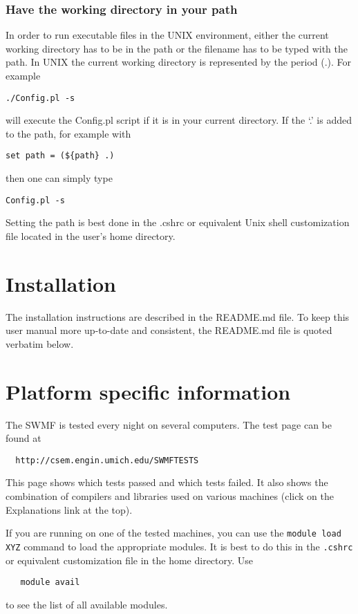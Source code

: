 \subsubsection{Have the working directory in your path}

In order to run executable files in the UNIX environment, either
the current working directory has to be in the path or the filename has
to be typed with the path.
In UNIX the current working directory is represented
by the period (.).  For example
\begin{verbatim} 
./Config.pl -s
\end{verbatim}
will execute the Config.pl script if it is in your current directory.  
If the `.' is added to the path, for example with
\begin{verbatim}
set path = (${path} .)
\end{verbatim}
then one can simply type
\begin{verbatim} 
Config.pl -s
\end{verbatim}
Setting the path is best done in the .cshrc or equivalent Unix shell 
customization file located in the user's home directory.

\section{Installation}

The installation instructions are described in the README.md file.
To keep this user manual more up-to-date and consistent, 
the README.md file is quoted verbatim below.


\section{Platform specific information}

The SWMF is tested every night on several computers.
The test page can be found at
\begin{verbatim}
  http://csem.engin.umich.edu/SWMFTESTS
\end{verbatim}
This page shows which tests passed and which tests failed.
It also shows the combination of compilers and libraries
used on various machines (click on the Explanations link at the top).

If you are running on one of the tested machines, 
you can use the {\tt module load XYZ} command to load 
the appropriate modules. It is best to do this in the {\tt .cshrc}
or equivalent customization file in the home directory. Use
\begin{verbatim}
   module avail
\end{verbatim}
to see the list of all available modules.

